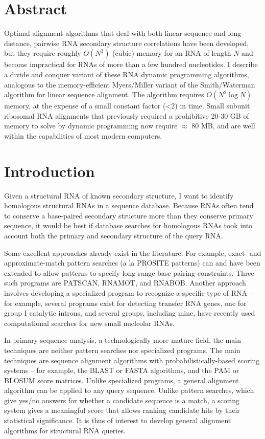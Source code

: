 
\section{Abstract}

Optimal alignment algorithms that deal with both linear sequence and
long-distance, pairwise RNA secondary structure correlations have been
developed, but they require roughly $O(N^3)$ (cubic) memory for an RNA
of length $N$ and become impractical for RNAs of more than a few
hundred nucleotides. I describe a divide and conquer variant of these
RNA dynamic programming algorithms, analogous to the memory-efficient
Myers/Miller variant of the Smith/Waterman algorithm for linear
sequence alignment. The algorithm requires $O(N^2 \log N)$ memory, at
the expense of a small constant factor (<2) in time. Small subunit
ribosomal RNA alignments that previously required a prohibitive 20-30
GB of memory to solve by dynamic programming now require $\approx$ 80
MB, and are well within the capabilities of most modern computers.

\section{Introduction}

Given a structural RNA of known secondary structure, I want to
identify homologous structural RNAs in a sequence database. Because
RNAs often tend to conserve a base-paired secondary structure more
than they conserve primary sequence, it would be best if database
searches for homologous RNAs took into account both the primary and
secondary structure of the query RNA.

Some excellent approaches already exist in the literature. For
example, exact- and approximate-match pattern searches (a la PROSITE
patterns) can and have been extended to allow patterns to specify
long-range base pairing constraints. Three such programs are PATSCAN,
RNAMOT, and RNABOB. Another approach involves developing a specialized
program to recognize a specific type of RNA -- for example, several
programs exist for detecting transfer RNA genes, one for group I
catalytic introns, and several groups, including mine, have recently
used computational searches for new small nucleolar RNAs.

In primary sequence analysis, a technologically more mature field, the
main techniques are neither pattern searches nor specialized
programs. The main techniques are sequence alignment algorithms with
probabilistically-based scoring systems -- for example, the BLAST or
FASTA algorithms, and the PAM or BLOSUM score matrices. Unlike
specialized programs, a general alignment algorithm can be applied to
any query sequence. Unlike pattern searches, which give yes/no answers
for whether a candidate sequence is a match, a scoring system gives a
meaningful score that allows ranking candidate hits by their
statistical significance. It is thus of interest to develop general
alignment algorithms for structural RNA queries.

